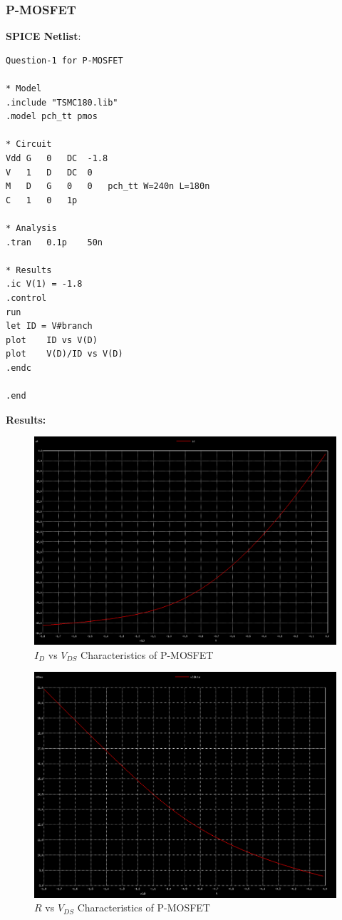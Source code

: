 \documentclass{article}
\begin{document}
\subsubsection{P-MOSFET}
\textbf{SPICE Netlist}:
\begin{lstlisting}
Question-1 for P-MOSFET

* Model
.include "TSMC180.lib"
.model pch_tt pmos

* Circuit
Vdd	G	0	DC	-1.8	
V	1	D	DC	0
M	D	G	0	0	pch_tt W=240n L=180n
C	1	0	1p

* Analysis
.tran	0.1p	50n

* Results
.ic	V(1) = -1.8
.control
run
let ID = V#branch 
plot	ID vs V(D)
plot	V(D)/ID vs V(D)
.endc

.end
\end{lstlisting}
\textbf{Results:}
\begin{figure}[!ht]
    \centering
    \includegraphics[scale=0.25]{Images/1pmosa.png}
    \caption{$I_D$ vs $V_{DS}$ Characteristics of P-MOSFET}
\end{figure}
\begin{figure}[!ht]
    \centering
    \includegraphics[scale=0.27]{Images/1pmosb.png}
    \caption{$R$ vs $V_{DS}$ Characteristics of P-MOSFET}
\end{figure}
\end{document}
